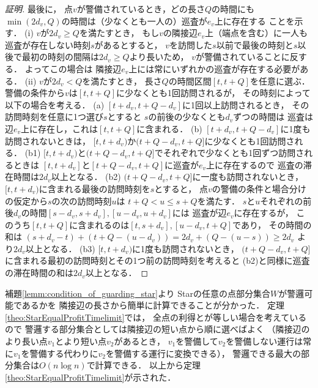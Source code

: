 \begin{proof}[証明]
  最後に，
  点$v$が警備されているとき，どの長さ$Q$の時間にも
  $\min(2d_v, Q)$の時間は（少なくとも一人の）巡査が$e_v$上に存在する
  ことを示す．
  (i) $v$が$2d_v \geq Q$を満たすとき，
    もし$v$の隣接辺$e_v$上（端点を含む）に一人も巡査が存在しない時刻$s$があるとすると，
    $v$を訪問した$s$以前で最後の時刻と$s$以後で最初の時刻の間隔は$2d_v \geq Q$より長いため，
    $v$が警備されていることに反する．
    よってこの場合は
    隣接辺$e_v$上には常にいずれかの巡査が存在する必要がある．
  (ii) $v$が$2d_v < Q$を満たすとき，
    長さ$Q$の時間区間$[t, t + Q]$を任意に選ぶ．
    警備の条件から$v$は$[t, t + Q]$に少なくとも1回訪問されるが，
    その時刻によって以下の場合を考える．
    (a) $[t + d_v, t + Q - d_v]$に1回以上訪問されるとき，
      その訪問時刻を任意に1つ選び$s$とすると
      $s$の前後の少なくとも$d_v$ずつの時間は
      巡査は辺$e_v$上に存在し，これは$[t, t + Q]$に含まれる．
    (b) $[t + d_v, t + Q - d_v]$に1度も訪問されないときは，
      $[t, t + d_v)$か$(t + Q - d_v, t + Q]$に少なくとも1回訪問される．
      (b1) $[t, t + d_v)$と$(t + Q - d_v, t + Q]$でそれぞれで少なくとも1回ずつ訪問されるときは
        $[t, t + d_v]$と$[t + Q - d_v, t + Q]$に巡査が$e_v$上に存在するので
        巡査の滞在時間は$2d_v$以上となる．
      (b2) $(t + Q - d_v, t + Q]$に一度も訪問されないとき，
        $[t, t + d_v)$に含まれる最後の訪問時刻を$s$とすると，
        点$v$の警備の条件と場合分けの仮定から$s$の次の訪問時刻$u$は
        $t + Q < u \leq s + Q$を満たす．
        $s$と$u$それぞれの前後$d_v$の時間$[s - d_v, s + d_v], [u - d_v, u + d_v]$には
        巡査が辺$e_v$に存在するが，
        このうち$[t, t + Q]$に含まれるのは$[t, s + d_v], [u - d_v, t + Q]$であり，
        その時間の和は
        $(s + d_v - t) + (t + Q - (u - d_v)) = 2d_v + (Q - (u - s)) \geq 2d_v$
        より$2d_v$以上となる．
      (b3) $[t, t + d_v)$に1度も訪問されないとき，
        $(t + Q - d_v, t + Q]$に含まれる最初の訪問時刻とその1つ前の訪問時刻を考えると
        (b2)と同様に巡査の滞在時間の和は$2d_v$以上となる．
        
\end{proof}



補題\ref{lemm:condition_of_guarding_star}より
Starの任意の点部分集合$W$が警邏可能であるかを
隣接辺の長さから簡単に計算できることが分かった．
定理\ref{theo:StarEqualProfitTimelimit}では，
全点の利得と{\idletime}が等しい場合を考えているので
警邏する部分集合としては隣接辺の短い点から順に選べばよく
（隣接辺のより長い点$v_1$とより短い点$v_2$があるとき，
$v_1$を警備して$v_2$を警備しない運行は常に$v_1$を警備する代わりに$v_2$を警備する運行に変換できる），
警邏できる最大の部分集合は$O(n \log n)$で計算できる．
以上から定理\ref{theo:StarEqualProfitTimelimit}が示された．

